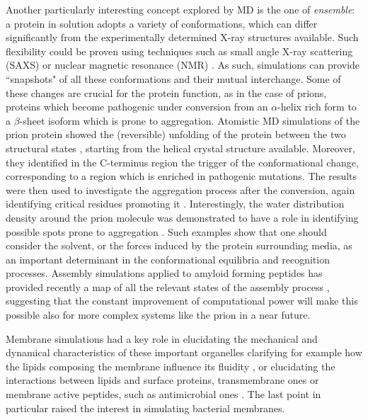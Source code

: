 \documentclass[graybox]{svmult}
\begin{document}
Another particularly interesting concept explored by MD is the one of \emph{ensemble}: a protein in solution adopts a variety of conformations, which can differ significantly from the experimentally determined X-ray structures available.
%
Such flexibility could be proven using techniques such as small angle X-ray scattering (SAXS) or nuclear magnetic resonance (NMR) \cite{Bonomi2017,Kikhney2015,Kleckner2011}. As such, simulations can provide ``snapshots" of all these conformations and their mutual interchange.
%
Some of these changes are crucial for the protein function, as in the case of prions, proteins which become pathogenic under conversion from an $\alpha$-helix rich form to a $\beta$-sheet isoform which is prone to aggregation. 
Atomistic MD simulations of the prion protein showed the (reversible) unfolding of the protein between the two structural states \cite{Chakroun2013}, starting from the helical crystal structure available. Moreover, they identified in the C-terminus region the trigger of the conformational change, corresponding to a region which is enriched in pathogenic mutations. The results were then used to investigate the aggregation process after the conversion, again identifying critical residues promoting it \cite{Collu2018}. 
Interestingly, the water distribution density around the prion molecule was demonstrated to have a role in identifying possible spots prone to aggregation \cite{DeSimone2005,DeSimone2006}. Such examples show that one should consider the solvent, or the forces induced by the protein surrounding media, as an important determinant in the conformational equilibria and recognition processes.
%
Assembly simulations applied to amyloid forming peptides has provided recently a map of all the relevant states of the assembly process \cite{Sengupta2019}, suggesting that the constant improvement of computational power will make this possible also for more complex systems like the prion in a near future.


Membrane simulations had a key role in elucidating the mechanical and dynamical characteristics of these important organelles clarifying for example how the lipids composing the membrane influence its fluidity \cite{Risselada2008,Song2019}, or elucidating the interactions between lipids and surface proteins, transmembrane ones or membrane active peptides, such as antimicrobial ones \cite{Leontiadou2006,Ulmschneider2017,Sun2015}. The last point in particular raised the interest in simulating bacterial membranes.
\end{document}
